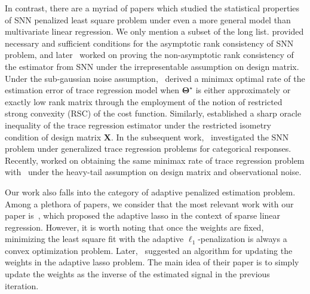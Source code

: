 \documentclass[alpha-refs]{wiley-article}
\begin{document}
In contrast, there are a myriad of papers which studied the statistical properties of SNN penalized least square problem under even a more general model than multivariate linear regression.
We only mention a subset of the long list.
\citet{bach2008consistency} provided necessary and sufficient conditions for the asymptotic rank consistency of SNN problem, and later~\citet{lee2015model} worked on proving the non-asymptotic rank consistency of the estimator from SNN under the irrepresentable assumption on design matrix.
Under the sub-gaussian noise assumption,~\citet{negahban2011estimation} derived a minimax optimal rate of the estimation error of trace regression model when $\boldsymbol{\Theta}^{\star}$ is either approximately or exactly low rank matrix through the employment of the notion of restricted strong convexity (RSC) of the cost function.
Similarly, \citet{koltchinskii2011nuclear} established a sharp oracle inequality of the trace regression estimator under the restricted isometry condition of design matrix $\boldsymbol{X}$.
In the subsequent work,~\citet{fan2019generalized} investigated the SNN problem under generalized trace regression problems for categorical responses.
Recently, \citet{fan2021shrinkage} worked on obtaining the same minimax rate of trace regression problem with~\citet{negahban2011estimation} under the heavy-tail assumption on design matrix and observational noise.

Our work also falls into the category of adaptive penalized estimation problem.
Among a plethora of papers, we consider that the most relevant work with our paper is~\citet{zou2006adaptive}, which proposed the adaptive lasso in the context of sparse linear regression.
However, it is worth noting that once the weights are fixed, minimizing the least square fit with the adaptive $\ell_{1}$-penalization is always a convex optimization problem. 
Later,~\citet{candes2008enhancing} suggested an algorithm for updating the weights in the adaptive lasso problem.
The main idea of their paper is to simply update the weights as the inverse of the estimated signal in the previous iteration.
\end{document}
